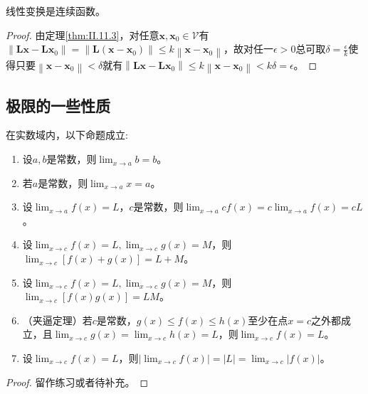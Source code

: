 \documentclass[main.tex]{subfiles}
\begin{document}
\begin{corollary}
线性变换是连续函数。
\end{corollary}
\begin{proof}
由定理\ref{thm:II.11.3}，对任意$\mathbf{x},\mathbf{x}_0\in\mathcal{V}$有$\left\|\mathbf{Lx}-\mathbf{Lx}_0\right\|=\left\|\mathbf{L}\left(\mathbf{x}-\mathbf{x}_0\right)\right\|\leq k\left\|\mathbf{x}-\mathbf{x}_0\right\|$，故对任一$\epsilon>0$总可取$\delta=\frac{\epsilon}{k}$使得只要$\left\|\mathbf{x}-\mathbf{x}_0\right\|<\delta$就有$\left\|\mathbf{Lx}-\mathbf{Lx}_0\right\|\leq k\left\|\mathbf{x}-\mathbf{x}_0\right\|<k\delta=\epsilon$。
\end{proof}

\subsection{极限的一些性质}
\begin{theorem}[极限基本性质]
在实数域内，以下命题成立:
\begin{enumerate}
    \item 设$a,b$是常数，则$\lim_{x\to a}b=b$。
    \item 若$a$是常数，则$\lim_{x\to a} x=a$。
    \item 设$\lim_{x\to a}f\left(x\right)=L$，$c$是常数，则$\lim_{x\to a}cf\left(x\right)=c\lim_{x\to a}f\left(x\right)=cL$。
    \item 设$\lim_{x\to c}f\left(x\right)=L,\lim_{x\to c}g\left(x\right)=M$，则$\lim_{x\to c}\left[f\left(x\right)+g\left(x\right)\right]=L+M$。
    \item 设$\lim_{x\to c}f\left(x\right)=L,\lim_{x\to c}g\left(x\right)=M$，则$\lim_{x\to c}\left[f\left(x\right)g\left(x\right)\right]=LM$。
    \item （夹逼定理）若$c$是常数，$g\left(x\right)\leq f\left(x\right)\leq h\left(x\right)$至少在点$x=c$之外都成立，且$\lim_{x\to c}g\left(x\right)=\lim_{x\to c}h\left(x\right)=L$，则$\lim_{x\to c}f\left(x\right)=L$。
    \item 设$\lim_{x\to c}f\left(x\right)=L$，则$\left|\lim_{x\to c}f\left(x\right)\right|=\left|L\right|=\lim_{x\to c}\left|f\left(x\right)\right|$。
\end{enumerate}
\end{theorem}
\begin{proof}
留作练习或者待补充。
\end{proof}
\end{document}
